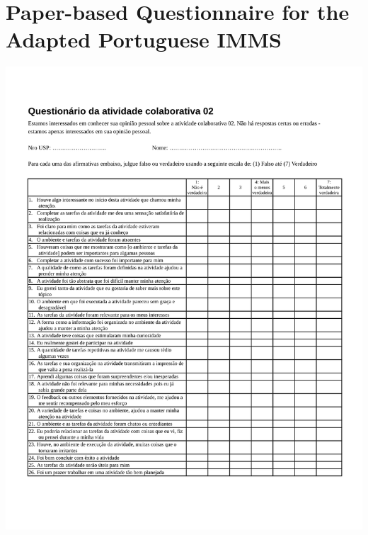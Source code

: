 \section[Paper-based Questionnaire for the Adapted Portuguese IMMS]{Paper-based Questionnaire for the Adapted Portuguese IMMS}
\label{annex:IMMS-second-study}
\includegraphics[width=1\textwidth]{images/annex/IMMS-second-study.pdf}

\newpage
